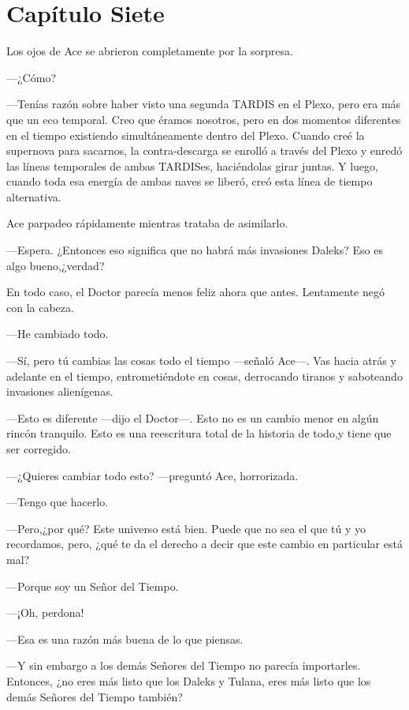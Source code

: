 \chapter*{Capítulo Siete}

Los ojos de Ace se abrieron completamente por la sorpresa.

---¿Cómo?

---Tenías razón sobre haber visto una segunda TARDIS en el
Plexo, pero era más que un eco temporal. Creo que éramos nosotros, pero
en dos momentos diferentes en el tiempo existiendo simultáneamente
dentro del Plexo. Cuando creé la supernova para sacarnos, la
contra-descarga se enrolló a través del Plexo y enredó las líneas
temporales de ambas TARDISes, haciéndolas girar juntas. Y luego, cuando
toda esa energía de ambas naves se liberó, creó esta línea de tiempo
alternativa.

Ace parpadeo rápidamente mientras trataba de asimilarlo.

---Espera. ¿Entonces eso significa que no habrá más invasiones
Daleks? Eso es algo bueno,¿verdad?

En todo caso, el Doctor parecía menos feliz ahora que antes.
Lentamente negó con la cabeza.

---He cambiado todo.

---Sí, pero tú cambias las cosas todo el tiempo ---señaló
Ace---. Vas hacia atrás y adelante en el tiempo, entrometiéndote en
cosas, derrocando tiranos y saboteando invasiones alienígenas.

---Esto es diferente ---dijo el Doctor---. Esto no es un cambio
menor en algún rincón tranquilo. Esto es una reescritura total de la
historia de todo,y tiene que ser corregido.

---¿Quieres cambiar todo esto? ---preguntó Ace, horrorizada.

---Tengo que hacerlo.

---Pero,¿por qué? Este universo está bien. Puede que no sea el
que tú y yo recordamos, pero, ¿qué te da el derecho a decir que este
cambio en particular está mal?

---Porque soy un Señor del Tiempo.

---¡Oh, perdona!

---Esa es una razón más buena de lo que piensas.

---Y sin embargo a los demás Señores del Tiempo no parecía
importarles. Entonces, ¿no eres más listo que los Daleks y Tulana, eres
más listo que los demás Señores del Tiempo también?

